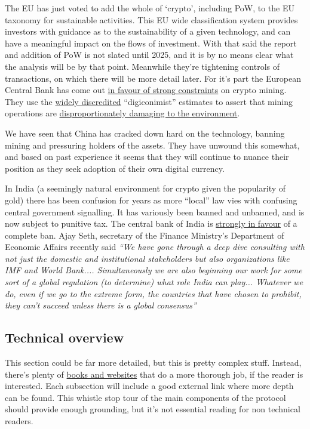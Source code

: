 The EU has just voted to add the whole of `crypto', including PoW, to the EU taxonomy for sustainable activities. This EU wide classification system provides investors with guidance as to the sustainability of a given technology, and can have a meaningful impact on the flows of investment. With that said the report and addition of PoW is not slated until 2025, and it is by no means clear what the analysis will be by that point. Meanwhile they're tightening controls of transactions, on which there will be more detail later. For it's part the European Central Bank has come out \href{}{in favour of strong constraints} on crypto mining. They use the \href{https://medium.com/crescofin/the-reports-of-bitcoin-environmental-damage-are-garbage-5a93d32c2d7}{widely discredited} ``digiconimist'' estimates to assert that mining operations are \href{https://www.ecb.europa.eu/pub/financial-stability/macroprudential-bulletin/html/ecb.mpbu202207_3~d9614ea8e6.en.html}{disproportionately damaging to the environment}.  \par
We have seen that China has cracked down hard on the technology, banning mining and pressuring holders of the assets. They have unwound this somewhat, and based on past experience it seems that they will continue to nuance their position as they seek adoption of their own digital currency.\par
In India (a seemingly natural environment for crypto given the popularity of gold) there has been confusion for years as more ``local'' law vies with confusing central government signalling. It has variously been banned and unbanned, and is now subject to punitive tax. The central bank of India is \href{http://164.100.24.220/loksabhaquestions/annex/179/AS10.pdf}{strongly in favour} of a complete ban. Ajay Seth, secretary of the Finance Ministry's Department of Economic Affairs recently said \textit{``We have gone through a deep dive consulting with not just the domestic and institutional stakeholders but also organizations like IMF and World Bank.... Simultaneously we are also beginning our work for some sort of a global regulation (to determine) what role India can play... Whatever we do, even if we go to the extreme form, the countries that have chosen to prohibit, they can't succeed unless there is a global consensus''}
\subsection{Technical overview}
This section could be far more detailed, but this is pretty complex stuff. Instead, there's plenty of \href{https://github.com/bitcoinbook/bitcoinbook}{books and websites} that do a more thorough job, if the reader is interested. Each subsection will include a good external link where more depth can be found. This whistle stop tour of the main components of the protocol should provide enough grounding, but it's not essential reading for non technical readers.\par
